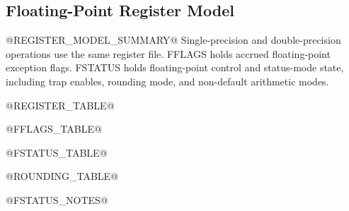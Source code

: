 \subsection{Floating-Point Register Model}
@REGISTER_MODEL_SUMMARY@
Single-precision and double-precision operations use the same register file. FFLAGS holds accrued
floating-point exception flags. FSTATUS holds floating-point control and status-mode state, including
trap enables, rounding mode, and non-default arithmetic modes.

@REGISTER_TABLE@

@FFLAGS_TABLE@

@FSTATUS_TABLE@

@ROUNDING_TABLE@

@FSTATUS_NOTES@
